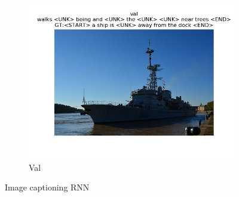 \documentclass[12pt]{article}
\begin{document}
\begin{figure}[htbp]
\begin{subfigure}[t]{0.48\textwidth}
        \centering
        \includegraphics[trim={3in 0in 3in 0in},scale=0.5]{./Homework2/output/hw2p5_fig05.png}
        \caption{Val}
    \label{hw2p5e}
    \end{subfigure}
    \caption{Image captioning RNN}
\end{figure}
\end{document}
